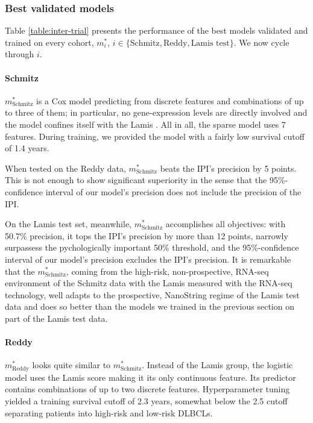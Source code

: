 \subsubsection{Best validated models}

Table \ref{table:inter-trial} presents the performance of the best models validated and trained on 
every cohort, $m_i^*$, $i \in \{ \text{Schmitz}, \text{Reddy}, \text{Lamis test} \}$. We now cycle 
through $i$.



\paragraph{Schmitz}
$m^*_\text{Schmitz}$ is a Cox model predicting from discrete features and combinations of up to 
three of them; in particular, no gene-expression levels are directly involved and the model confines 
itself with the Lamis . All in all, the sparse model uses \num{7} features. During 
training, we provided the model with a fairly low survival cutoff of \num{1.4} years.

When tested on the Reddy data, $m^*_\text{Schmitz}$ beats the IPI's precision by 5 points. This 
is not enough to show significant superiority in the sense that the \num{95}\%-confidence interval 
of our model's precision does not include the precision of the IPI.

On the Lamis test set, meanwhile, $m^*_\text{Schmitz}$ accomplishes all objectives: with 
\num{50.7}\% precision, it tops the IPI's precision by more than 12 points, narrowly surpassess the 
pychologically important \num{50}\% threshold, and the \num{95}\%-confidence interval of our model's 
precision excludes the IPI's precision. It is remarkable that the $m^*_\text{Schmitz}$, coming from 
the high-risk, non-prospective, RNA-seq environment of the Schmitz data with the Lamis measured with the 
RNA-seq technology, well adapts to the prospective, NanoString regime of the Lamis test data and 
does so better than the models we trained in the previous section on part of the Lamis test data.

\paragraph{Reddy}
$m^*_\text{Reddy}$ looks quite similar to $m^*_\text{Schmitz}$. Instead of the Lamis group, the 
logistic model uses the Lamis score making it its only continuous feature. Its predictor contains 
combinations of up to two discrete features. Hyperparameter tuning yielded a training survival 
cutoff of \num{2.3} years, somewhat below the \num{2.5} cutoff separating patients into high-risk 
and low-risk DLBCLs. 

